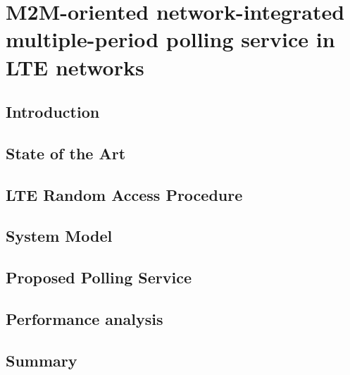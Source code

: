 
\chapter{M2M-oriented network-integrated multiple-period polling service in LTE networks}

\ifpdf
    \graphicspath{{Chapter2/Figs/Raster/}{Chapter2/Figs/PDF/}{Chapter2/Figs/}}
\else
    \graphicspath{{Chapter2/Figs/Vector/}{Chapter2/Figs/}}
\fi

\section{Introduction}

\section{State of the Art}

\section{LTE Random Access Procedure}

\section{System Model}

\section{Proposed Polling Service}

\section{Performance analysis}

\section{Summary}





